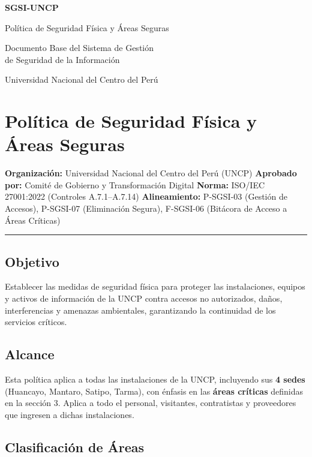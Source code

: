 \documentclass[10pt,letterpaper]{article}
\newcommand{\makecover}{
\begin{titlepage}
\centering
\vspace*{2cm}
{\Huge\bfseries\color{uncpblue} SGSI-UNCP\par}
\vspace{0.7cm}
{\LARGE Política de Seguridad Física y Áreas Seguras\par}
\vspace{0.5cm}
{\large Documento Base del Sistema de Gestión\\de Seguridad de la Información\par}
\vspace{1.5cm}
{\small Universidad Nacional del Centro del Perú\par}
\vfill
\end{titlepage}
}
\begin{document}
\makecover
\setcounter{tocdepth}{2}
\RaggedRight
\tableofcontents
\newpage

\RaggedRight
\section{Política de Seguridad Física y Áreas
Seguras}\label{poluxedtica-de-seguridad-fuxedsica-y-uxe1reas-seguras}

\textbf{Organización:} Universidad Nacional del Centro del Perú (UNCP)
\textbf{Aprobado por:} Comité de Gobierno y Transformación Digital
\textbf{Norma:} ISO/IEC 27001:2022 (Controles A.7.1--A.7.14)
\textbf{Alineamiento:} P-SGSI-03 (Gestión de Accesos), P-SGSI-07
(Eliminación Segura), F-SGSI-06 (Bitácora de Acceso a Áreas Críticas)

\begin{center}\rule{0.5\linewidth}{0.5pt}\end{center}

\subsection{Objetivo}\label{objetivo}

Establecer las medidas de seguridad física para proteger las
instalaciones, equipos y activos de información de la UNCP contra
accesos no autorizados, daños, interferencias y amenazas ambientales,
garantizando la continuidad de los servicios críticos.

\subsection{Alcance}\label{alcance}

Esta política aplica a todas las instalaciones de la UNCP, incluyendo
sus \textbf{4 sedes} (Huancayo, Mantaro, Satipo, Tarma), con énfasis en
las \textbf{áreas críticas} definidas en la sección 3. Aplica a todo el
personal, visitantes, contratistas y proveedores que ingresen a dichas
instalaciones.

\subsection{Clasificación de Áreas}\label{clasificaciuxf3n-de-uxe1reas}
\end{document}
